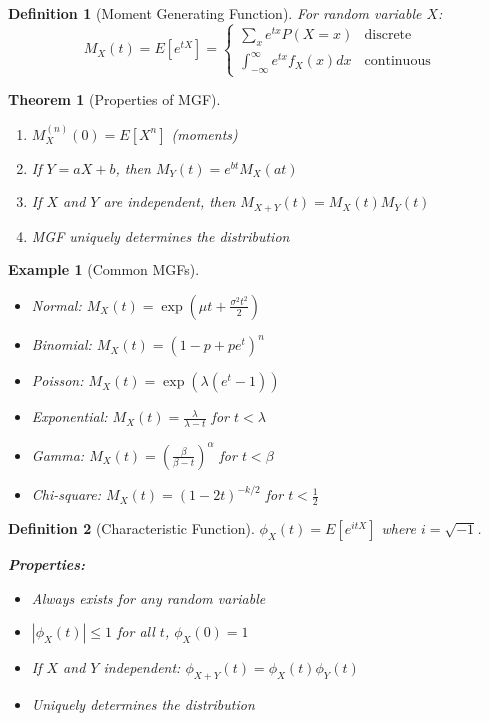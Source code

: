 \documentclass[12pt,a4paper]{amsart}
\newtheorem{theorem}{Theorem}[section]
\newtheorem{definition}{Definition}[section]
\newtheorem{example}{Example}[section]
\theoremstyle{remark}
\begin{document}
\begin{definition}[Moment Generating Function]
For random variable $X$:
$$M_X(t) = E[e^{tX}] = \begin{cases}
\sum_x e^{tx} P(X=x) & \text{discrete} \\
\int_{-\infty}^{\infty} e^{tx} f_X(x) dx & \text{continuous}
\end{cases}$$
\end{definition}

\begin{theorem}[Properties of MGF]
\begin{enumerate}
\item $M_X^{(n)}(0) = E[X^n]$ (moments)
\item If $Y = aX + b$, then $M_Y(t) = e^{bt} M_X(at)$
\item If $X$ and $Y$ are independent, then $M_{X+Y}(t) = M_X(t) M_Y(t)$
\item MGF uniquely determines the distribution
\end{enumerate}
\end{theorem}

\begin{example}[Common MGFs]
\begin{itemize}
\item Normal: $M_X(t) = \exp(\mu t + \frac{\sigma^2 t^2}{2})$
\item Binomial: $M_X(t) = (1-p+pe^t)^n$
\item Poisson: $M_X(t) = \exp(\lambda(e^t-1))$
\item Exponential: $M_X(t) = \frac{\lambda}{\lambda-t}$ for $t < \lambda$
\item Gamma: $M_X(t) = \left(\frac{\beta}{\beta-t}\right)^\alpha$ for $t < \beta$
\item Chi-square: $M_X(t) = (1-2t)^{-k/2}$ for $t < \frac{1}{2}$
\end{itemize}
\end{example}

\begin{definition}[Characteristic Function]
$\phi_X(t) = E[e^{itX}]$ where $i = \sqrt{-1}$.

\textbf{Properties:}
\begin{itemize}
\item Always exists for any random variable
\item $|\phi_X(t)| \leq 1$ for all $t$, $\phi_X(0) = 1$
\item If $X$ and $Y$ independent: $\phi_{X+Y}(t) = \phi_X(t)\phi_Y(t)$
\item Uniquely determines the distribution
\end{itemize}
\end{definition}
\end{document}
